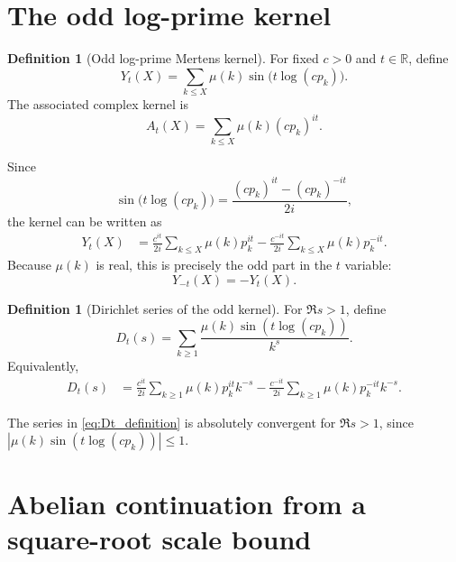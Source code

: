 \documentclass[11pt]{amsart}
\numberwithin{equation}{section}
\theoremstyle{plain}
\theoremstyle{definition}
\newtheorem{definition}[theorem]{Definition}
\theoremstyle{remark}
\begin{document}
\section{The odd log-prime kernel}
\label{sec:kernel_definition}

\begin{definition}[Odd log-prime Mertens kernel]
\label{def:odd_log_prime_kernel}
For fixed $c>0$ and $t\in\mathbb R$, define
\begin{equation}
Y_t(X)=\sum_{k\le X}\mu(k)\sin\bigl(t\log(c p_k)\bigr).
\label{eq:def_YtX}
\end{equation}
The associated complex kernel is
\begin{equation}
A_t(X)=\sum_{k\le X}\mu(k)(c p_k)^{it}.
\label{eq:def_AtX}
\end{equation}
\end{definition}

Since
\begin{equation}
\sin\bigl(t\log(c p_k)\bigr)=
\frac{(c p_k)^{it}-(c p_k)^{-it}}{2i},
\label{eq:sine_exponential_decomposition}
\end{equation}
the kernel can be written as
\begin{align}
Y_t(X)
&=\frac{c^{it}}{2i}\sum_{k\le X}\mu(k)p_k^{it}
 -\frac{c^{-it}}{2i}\sum_{k\le X}\mu(k)p_k^{-it}.
\label{eq:Yt_complex_decomposition}
\end{align}
Because $\mu(k)$ is real, this is precisely the odd part in the $t$
variable:
\begin{equation}
Y_{-t}(X)=-Y_t(X).
\label{eq:Yt_oddness}
\end{equation}

\begin{definition}[Dirichlet series of the odd kernel]
\label{def:Dt_series}
For $\Re s>1$, define
\begin{equation}
D_t(s)=\sum_{k\ge1}\frac{\mu(k)\sin(t\log(c p_k))}{k^s}.
\label{eq:Dt_definition}
\end{equation}
Equivalently,
\begin{align}
D_t(s)
&=\frac{c^{it}}{2i}\sum_{k\ge1}\mu(k)p_k^{it}k^{-s}
 -\frac{c^{-it}}{2i}\sum_{k\ge1}\mu(k)p_k^{-it}k^{-s}.
\label{eq:Dt_plus_minus}
\end{align}
\end{definition}

The series in \eqref{eq:Dt_definition} is absolutely convergent for
$\Re s>1$, since $|\mu(k)\sin(t\log(c p_k))|\le1$.

\section{Abelian continuation from a square-root scale bound}
\label{sec:abelian_continuation}
\end{document}
